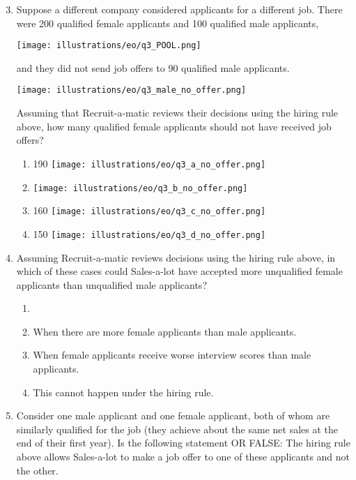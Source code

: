 \documentclass{article}
\newcommand{\correct}[1]{{\color{red}{#1}}}
\newcommand{\correct}[1]{{\color{red}{#1}}}
\begin{document}
\begin{enumerate}
\setcounter{enumi}{2}
    \item Suppose a different company considered applicants for a different job. There were 200 qualified female applicants and 100 qualified male applicants,

\texttt{[image: illustrations/eo/q3\_POOL.png]}

and they did not send job offers to 90 qualified male applicants.

\texttt{[image: illustrations/eo/q3\_male\_no\_offer.png]}

Assuming that Recruit-a-matic reviews their decisions using the hiring rule above, how many qualified female applicants should not have received job offers?
\begin{enumerate}
    \item 190
    \texttt{[image: illustrations/eo/q3\_a\_no\_offer.png]}
    \item \correct{180}
    \texttt{[image: illustrations/eo/q3\_b\_no\_offer.png]}
    \item 160
    \texttt{[image: illustrations/eo/q3\_c\_no\_offer.png]}
    \item 150
    \texttt{[image: illustrations/eo/q3\_d\_no\_offer.png]}
\end{enumerate}

\item Assuming Recruit-a-matic reviews decisions using the hiring rule above, in which of these cases could Sales-a-lot have accepted more unqualified female applicants than unqualified male applicants?

\begin{enumerate}
    \item \correct{When there are more unqualified female applicants than unqualified male applicants (i.e., more women had low net sales at the end of the year).}
    \item When there are more female applicants than male applicants.
    \item When female applicants receive worse interview scores than male applicants.
    \item This cannot happen under the hiring rule.
\end{enumerate}

\item Consider one male applicant and one female applicant, both of whom are similarly qualified for the job (they achieve about the same net sales at the end of their first year). Is the following statement \correct{TRUE} OR FALSE: The hiring rule above allows Sales-a-lot to make a job offer to one of these applicants and not the other.


\end{enumerate}
\end{document}
